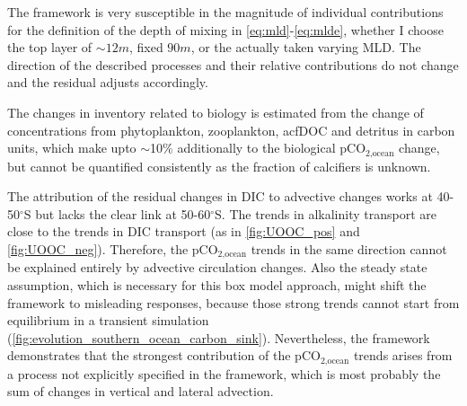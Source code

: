 The framework is very susceptible in the magnitude of individual contributions for the definition of the depth of mixing in \autoref{eq:mld}-\ref{eq:mlde}, \ie whether I choose the top layer of $\sim12m$, fixed $90 m$, or the actually taken varying \acf{MLD}. The direction of the described processes and their relative contributions do not change and the residual adjusts accordingly.

The changes in inventory related to biology is estimated from the change of concentrations from  phytoplankton, zooplankton, acf{DOC} and detritus in carbon units, which make upto $\sim$10\%  additionally to the biological pCO$_{\text{2,ocean}}$ change, but cannot be quantified consistently as the fraction of calcifiers is unknown.

The attribution of the residual changes in \acs{DIC} to advective changes works at 40-50$^\circ$S but lacks the clear link at 50-60$^\circ$S. The trends in alkalinity transport are close to the trends in \acs{DIC} transport (as in \autoref{fig:UOOC_pos} and \autoref{fig:UOOC_neg}). Therefore, the pCO$_{\text{2,ocean}}$ trends in the same direction cannot be explained entirely by advective circulation changes. Also the steady state assumption, which is necessary for this box model approach, might shift the framework to misleading responses, because those strong trends cannot start from equilibrium in a transient simulation (\autoref{fig:evolution_southern_ocean_carbon_sink}). Nevertheless, the framework demonstrates that the strongest contribution of the pCO$_{\text{2,ocean}}$ trends arises from a process not explicitly specified in the framework, which is most probably the sum of changes in vertical and lateral advection.


